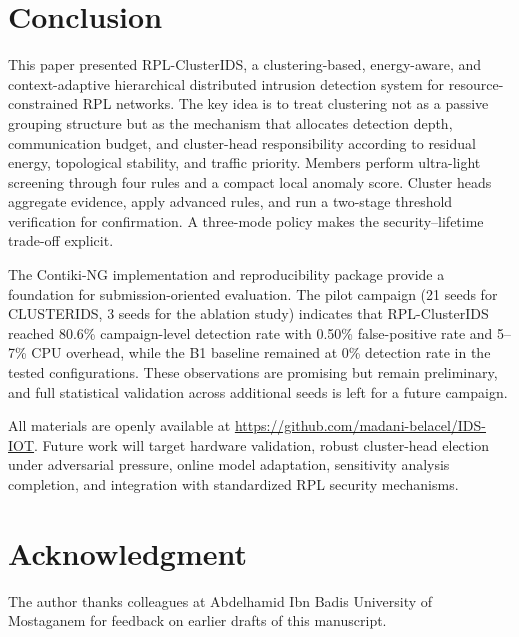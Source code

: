 \section{Conclusion}
\label{sec:concl}

This paper presented RPL-ClusterIDS, a clustering-based, energy-aware, and context-adaptive hierarchical distributed intrusion detection system for resource-constrained RPL networks.
The key idea is to treat clustering not as a passive grouping structure but as the mechanism that allocates detection depth, communication budget, and cluster-head responsibility according to residual energy, topological stability, and traffic priority.
Members perform ultra-light screening through four rules and a compact local anomaly score.
Cluster heads aggregate evidence, apply advanced rules, and run a two-stage threshold verification for confirmation.
A three-mode policy makes the security--lifetime trade-off explicit.

The Contiki-NG implementation and reproducibility package provide a foundation for submission-oriented evaluation. The pilot campaign (21 seeds for CLUSTERIDS, 3 seeds for the ablation study) indicates that RPL-ClusterIDS reached 80.6\% campaign-level detection rate with 0.50\% false-positive rate and 5--7\% CPU overhead, while the B1 baseline remained at 0\% detection rate in the tested configurations. These observations are promising but remain preliminary, and full statistical validation across additional seeds is left for a future campaign.

All materials are openly available at \url{https://github.com/madani-belacel/IDS-IOT}. Future work will target hardware validation, robust cluster-head election under adversarial pressure, online model adaptation, sensitivity analysis completion, and integration with standardized RPL security mechanisms.

\section*{Acknowledgment}
The author thanks colleagues at Abdelhamid Ibn Badis University of Mostaganem for feedback on earlier drafts of this manuscript.
